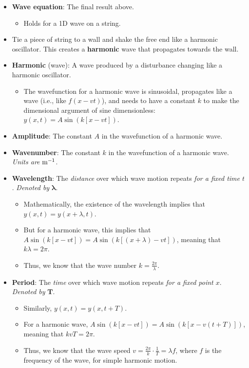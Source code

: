 \documentclass[../notes.tex]{subfiles}
\begin{document}
\begin{itemize}
    \item \textbf{Wave equation}: The final result above.
    \begin{itemize}
        \item Holds for a 1D wave on a string.
    \end{itemize}
    \item Tie a piece of string to a wall and shake the free end like a harmonic oscillator. This creates a \textbf{harmonic} wave that propagates towards the wall.
    \item \textbf{Harmonic} (wave): A wave produced by a disturbance changing like a harmonic oscillator.
    \begin{itemize}
        \item The wavefunction for a harmonic wave is sinusoidal, propagates like a wave (i.e., like $f(x-vt)$), and needs to have a constant $k$ to make the dimensional argument of sine dimensionless: $y(x,t)=A\sin(k[x-vt])$.
    \end{itemize}
    \item \textbf{Amplitude}: The constant $A$ in the wavefunction of a harmonic wave.
    \item \textbf{Wavenumber}: The constant $k$ in the wavefunction of a harmonic wave. \emph{Units are} $\si[per-mode=power]{\per\meter}$.
    \item \textbf{Wavelength}: The \emph{distance} over which wave motion repeats \emph{for a fixed time $t$}. \emph{Denoted by} $\bm{\lambda}$.
    \begin{itemize}
        \item Mathematically, the existence of the wavelength implies that $y(x,t)=y(x+\lambda,t)$.
        \item But for a harmonic wave, this implies that $A\sin(k[x-vt])=A\sin(k[(x+\lambda)-vt])$, meaning that $k\lambda=2\pi$.
        \item Thus, we know that the wave number $k=\frac{2\pi}{\lambda}$.
    \end{itemize}
    \item \textbf{Period}: The \emph{time} over which wave motion repeats \emph{for a fixed point $x$}. \emph{Denoted by} $\bm{T}$.
    \begin{itemize}
        \item Similarly, $y(x,t)=y(x,t+T)$.
        \item For a harmonic wave, $A\sin(k[x-vt])=A\sin(k[x-v(t+T)])$, meaning that $kvT=2\pi$.
        \item Thus, we know that the wave speed $v=\frac{2\pi}{k}\cdot\frac{1}{T}=\lambda f$, where $f$ is the frequency of the wave, for simple harmonic motion.

\end{itemize}
\end{itemize}
\end{document}

